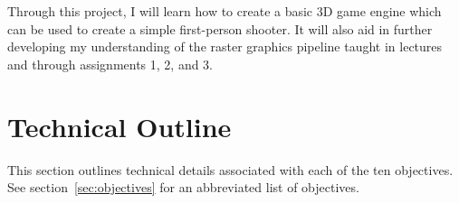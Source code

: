 \documentclass {article}
\begin{document}
Through this project, I will learn how to create a basic 3D game engine which can be used to create a simple first-person shooter. It will also aid in further developing my understanding of the raster graphics pipeline taught in lectures and through assignments 1, 2, and 3.











\newpage

\section{Technical Outline}\label{sec:tech}
This section outlines technical details associated with each of the ten objectives. See section~\ref{sec:objectives} for an abbreviated list of objectives.
\end{document}
